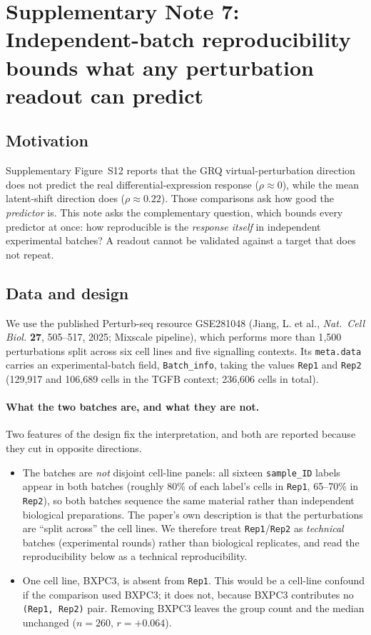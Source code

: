 \documentclass[11pt,a4paper]{article}
\begin{document}
\section*{Supplementary Note 7: Independent-batch reproducibility bounds what any perturbation readout can predict}
\label{sup:crossbatch}

\subsection*{Motivation}

Supplementary Figure~S12 reports that the GRQ virtual-perturbation direction does not predict the
real differential-expression response ($\rho\approx0$), while the mean latent-shift direction does
($\rho\approx0.22$). Those comparisons ask how good the \emph{predictor} is. This note asks the
complementary question, which bounds every predictor at once: how reproducible is the
\emph{response itself} in independent experimental batches? A readout cannot be validated against
a target that does not repeat.

\subsection*{Data and design}

We use the published Perturb-seq resource GSE281048 (Jiang, L. et al., \textit{Nat.\ Cell Biol.}
\textbf{27}, 505--517, 2025; Mixscale pipeline), which performs more than
1{,}500 perturbations split across six cell lines and five signalling contexts. Its
\texttt{meta.data} carries an experimental-batch field, \texttt{Batch\_info}, taking the values
\texttt{Rep1} and \texttt{Rep2} (129{,}917 and 106{,}689 cells in the TGFB context; 236{,}606 cells
in total).

\paragraph*{What the two batches are, and what they are not.}
Two features of the design fix the interpretation, and both are reported because they cut in
opposite directions.
\begin{itemize}\itemsep2pt
\item The batches are \emph{not} disjoint cell-line panels: all sixteen \texttt{sample\_ID} labels
appear in both batches (roughly 80\% of each label's cells in \texttt{Rep1}, 65--70\% in
\texttt{Rep2}), so both batches sequence the same material rather than independent biological
preparations. The paper's own description is that the perturbations are ``split across'' the cell
lines. We therefore treat \texttt{Rep1}/\texttt{Rep2} as \emph{technical} batches (experimental
rounds) rather than biological replicates, and read the reproducibility below as a technical
reproducibility.
\item One cell line, BXPC3, is absent from \texttt{Rep1}. This would be a cell-line confound if the
comparison used BXPC3; it does not, because BXPC3 contributes no \texttt{(Rep1, Rep2)} pair. Removing
BXPC3 leaves the group count and the median unchanged ($n=260$, $r=+0.064$).
\end{itemize}
\end{document}
